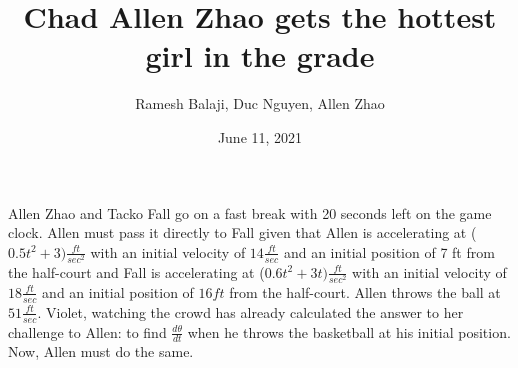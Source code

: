 \documentclass{article}
\begin{document}
\title{Chad Allen Zhao gets the hottest girl in the grade}
\author{Ramesh Balaji, Duc Nguyen, Allen Zhao}
\date{June 11, 2021}
\maketitle
Allen Zhao and Tacko Fall go on a fast break with 20 seconds left on the game clock. 
Allen must pass it directly to Fall given that Allen is accelerating at ($0.5t^2+3)\frac{ft}{sec^2}$
with an initial velocity of $14 \frac{ft}{sec}$ and an initial position of 7 ft from the half-court and Fall is accelerating at ($0.6t^2+3t) \frac{ft}{sec^2}$
with an initial velocity of $18 \frac{ft}{sec}$ and an initial position of $16 ft$ from the half-court. Allen throws the ball at 
$51 \frac{ft}{sec}$. Violet, watching the crowd has already calculated the answer to 
her challenge to Allen: to find $\frac{d\theta}{dt}$ when he throws the basketball at his
initial position. Now, Allen must do the same. 

\begin{center}
\end{center}
\end{document}
